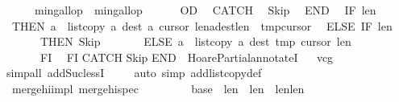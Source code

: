 \begin{isabellebody}
\ \ \ \ \ \ {\isasymacute}min{\isacharunderscore}gallop\ {\isacharcolon}{\isacharequal}{\isacharequal}\ {\isasymacute}min{\isacharunderscore}gallop\ {\isacharplus}\ {}\isanewline
\ \ \ \ OD\isanewline
\ \ CATCH\isanewline
\ \ Skip\isanewline
\ \ END{\isacharsemicolon}{\isacharsemicolon}\isanewline
\ \ IF\ {\isasymacute}len{}\ {\isacharequal}\ {}\isanewline
\ \ THEN\ {\isasymacute}a\ {\isacharcolon}{\isacharequal}{\isacharequal}\ list{\isacharunderscore}copy\ {\isasymacute}a\ {\isasymacute}dest\ {\isasymacute}a\ {\isasymacute}cursor{}\ {\isasymacute}len{}{\isacharsemicolon}{\isacharsemicolon}{\isasymacute}a{\isacharbang}{\isacharparenleft}{\isasymacute}dest{\isacharplus}{\isasymacute}len{}{\isacharparenright}\ {\isacharcolon}{\isacharequal}{\isacharequal}\ {\isasymacute}tmp{\isacharbang}{\isasymacute}cursor{}\isanewline
\ \ ELSE\ IF\ {\isasymacute}len{}\ {\isacharequal}\ {}\isanewline
\ \ \ \ \ \ \ THEN\ Skip\isanewline
\ \ \ \ \ \ \ ELSE\ {\isasymacute}a\ {\isacharcolon}{\isacharequal}{\isacharequal}\ list{\isacharunderscore}copy\ {\isasymacute}a\ {\isasymacute}dest\ {\isasymacute}tmp\ {\isasymacute}cursor{}\ {\isasymacute}len{}\ \isanewline
\ \ \ \ \ \ \ FI\isanewline
\ \ FI\isanewline
CATCH\isanewline
Skip\isanewline
END{\isachardoublequoteclose}\ \ HoarePartial{\isachardot}annotateI{\isacharparenright}\isanewline
\ \isamarkupfalse%
\ vcg\isanewline
\ \ \ \ \ \ \ \ \ \isamarkupfalse%
\ {\isacharparenleft}simp{\isacharunderscore}all\ add{\isacharcolon}Suc{\isacharunderscore}lessI{\isacharparenright}\isanewline
\ \ \ \isamarkupfalse%
\ {\isacharparenleft}auto\ simp\ add{\isacharcolon}list{\isacharunderscore}copy{\isacharunderscore}def{\isacharparenright}\isanewline
{}\isamarkupfalse%
%
\endisatagproof
{\isafoldproof}%
%
\isadelimproof
\ \isanewline
%
\endisadelimproof
\isanewline
\isanewline
\isanewline
\isanewline
{}\isamarkupfalse%
\ {\isacharparenleft}\ merge{\isacharunderscore}hi{\isacharunderscore}impl{\isacharparenright}\ merge{\isacharunderscore}hi{\isacharunderscore}spec{\isacharcolon}\isanewline
\ \ \isanewline
\ \ {\isachardoublequoteopen}{\isasymforall}{\isasymsigma}{\isachardot}\ {\isasymGamma}{\isasymturnstile}\ {\isasymlbrace}\ {\isasymsigma}{\isachardot}\ {\isasymacute}base{}{\isasymge}{}\ {\isasymand}\ {\isasymacute}len{}{\isachargreater}{}\ {\isasymand}\ {\isasymacute}len{}{\isachargreater}{}\ {\isasymand}\ {\isasymacute}len{}{\isasymge}{\isasymacute}len{}\ {\isasymand}\ \isanewline

\end{isabellebody}
